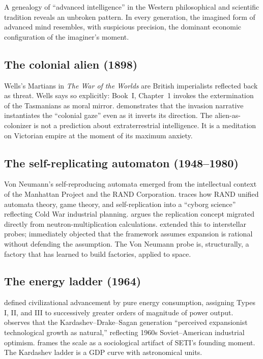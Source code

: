 \documentclass[11pt,a4paper,twocolumn]{article}
\begin{document}
A genealogy of ``advanced intelligence'' in the Western philosophical and
scientific tradition reveals an unbroken pattern. In every generation, the
imagined form of advanced mind resembles, with suspicious precision, the
dominant economic configuration of the imaginer's moment.

\subsection{The colonial alien (1898)}

Wells's Martians in \textit{The War of the Worlds} are British imperialists
reflected back as threat. Wells says so explicitly: Book~I, Chapter~1
invokes the extermination of the Tasmanians as moral mirror.
\citet{rieder2008} demonstrates that the invasion narrative instantiates
the ``colonial gaze'' even as it inverts its direction. The
alien-as-colonizer is not a prediction about extraterrestrial intelligence.
It is a meditation on Victorian empire at the moment of its maximum
anxiety.

\subsection{The self-replicating automaton (1948--1980)}

Von Neumann's self-reproducing automata emerged from the intellectual
context of the Manhattan Project and the RAND Corporation.
\citet{mirowski2002} traces how RAND unified automata theory, game theory,
and self-replication into a ``cyborg science'' reflecting Cold War
industrial planning. \citet{heims1980} argues the replication concept
migrated directly from neutron-multiplication calculations.
\citet{tipler1980} extended this to interstellar probes;
\citet{sagan1983} immediately objected that the framework assumes
expansion is rational without defending the assumption. The Von Neumann
probe is, structurally, a factory that has learned to build factories,
applied to space.

\subsection{The energy ladder (1964)}

\citet{kardashev1964} defined civilizational advancement by pure energy
consumption, assigning Types I, II, and III to successively greater orders
of magnitude of power output. \citet{cirkovic2015} observes that the
Kardashev--Drake--Sagan generation ``perceived expansionist technological
growth as natural,'' reflecting 1960s Soviet--American industrial
optimism. \citet{dick1996} frames the scale as a sociological artifact of
SETI's founding moment. The Kardashev ladder is a GDP curve with
astronomical units.
\end{document}
